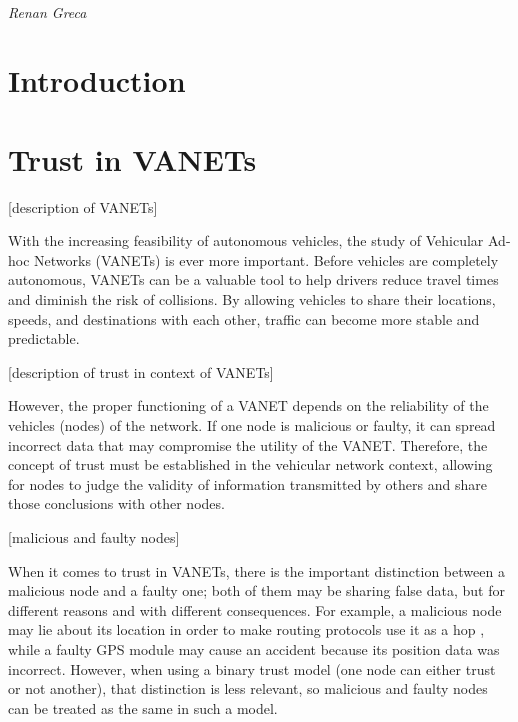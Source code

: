 \documentclass{article}
\makeatletter
\newcommand{\name}{Renan Greca}
\newcommand{\email}{renangreca@gmail.com}
\makeatother
\begin{document}
\pagestyle{fancy}
\lhead{\name}
\chead{}
\rhead{\email}
\lfoot{}
\cfoot{\thepage}
\rfoot{}


\begin{center}
    \Large
    \textbf{} \\
    \textit{Renan Greca} \\
    \small
\end{center}

\large
\doublespacing

\section{Introduction}

\section{Trust in VANETs}

[description of VANETs]

With the increasing feasibility of autonomous vehicles, the study of Vehicular Ad-hoc Networks (VANETs) is ever more important.
Before vehicles are completely autonomous, VANETs can be a valuable tool to help drivers reduce travel times and diminish the risk of collisions.
By allowing vehicles to share their locations, speeds, and destinations with each other, traffic can become more stable and predictable.

[description of trust in context of VANETs]

However, the proper functioning of a VANET depends on the reliability of the vehicles (nodes) of the network.
If one node is malicious or faulty, it can spread incorrect data that may compromise the utility of the VANET.
Therefore, the concept of trust must be established in the vehicular network context, allowing for nodes to judge the validity of information transmitted by others and share those conclusions with other nodes.

[malicious and faulty nodes]

When it comes to trust in VANETs, there is the important distinction between a malicious node and a faulty one; both of them may be sharing false data, but for different reasons and with different consequences.
For example, a malicious node may lie about its location in order to make routing protocols use it as a hop \cite{leinmuller2005influence}, while a faulty GPS module may cause an accident because its position data was incorrect.
However, when using a binary trust model (one node can either trust or not another), that distinction is less relevant, so malicious and faulty nodes can be treated as the same in such a model.
\end{document}
